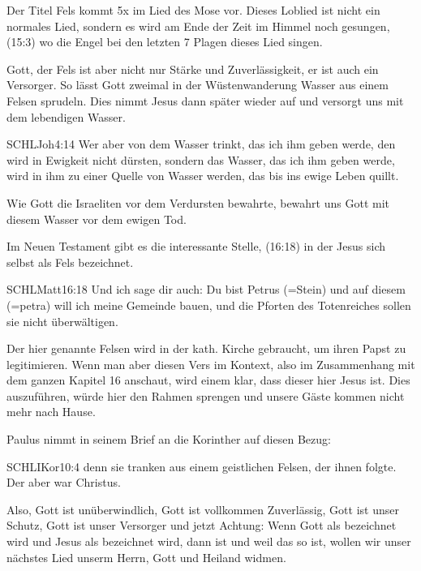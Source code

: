\begin{otsblock}[Gottesnamen]
Der Titel Fels kommt 5x im Lied des Mose vor. Dieses Loblied ist nicht ein normales Lied, sondern es wird am Ende der Zeit im Himmel noch gesungen, (15:3) wo die Engel bei den letzten 7 Plagen dieses Lied singen.

Gott, der Fels ist aber nicht nur Stärke und Zuverlässigkeit, er ist auch ein Versorger. So lässt Gott zweimal in der Wüstenwanderung Wasser aus einem Felsen sprudeln. Dies nimmt Jesus dann später wieder auf und versorgt uns mit dem lebendigen Wasser.
\begin{bibelbox}{SCHL}{Joh}{4:14}
Wer aber von dem Wasser trinkt, das ich ihm geben werde, den wird in Ewigkeit nicht dürsten, sondern das Wasser, das ich ihm geben werde, wird in ihm zu einer Quelle von Wasser werden, das bis ins ewige Leben quillt.
\end{bibelbox}
Wie Gott die Israeliten vor dem Verdursten bewahrte, bewahrt uns Gott mit diesem Wasser vor dem ewigen Tod.

Im Neuen Testament gibt es die interessante Stelle, (16:18) in der Jesus sich selbst als Fels bezeichnet.
\begin{bibelbox}{SCHL}{Matt}{16:18}
Und ich sage dir auch: Du bist Petrus (=Stein) und auf diesem  (=petra) will ich meine Gemeinde bauen, und die Pforten des Totenreiches sollen sie nicht überwältigen.
\end{bibelbox}
Der hier genannte Felsen wird in der kath. Kirche gebraucht, um ihren Papst zu legitimieren. Wenn man aber diesen Vers im Kontext, also im Zusammenhang mit dem ganzen Kapitel 16 anschaut, wird einem klar, dass dieser  hier Jesus ist. Dies auszuführen, würde hier den Rahmen sprengen und unsere Gäste kommen nicht mehr nach Hause.

Paulus nimmt in seinem Brief an die Korinther auf diesen  Bezug:
\begin{bibelbox}{SCHL}{IKor}{10:4}
denn sie tranken aus einem geistlichen Felsen, der ihnen folgte. Der  aber war Christus.
\end{bibelbox}

Also, Gott ist unüberwindlich, Gott ist vollkommen Zuverlässig, Gott ist unser Schutz, Gott ist unser Versorger und jetzt Achtung:
Wenn Gott als  bezeichnet wird und Jesus als  bezeichnet wird, dann ist  und weil das so ist, 
wollen wir unser nächstes Lied unserm Herrn, Gott und Heiland widmen.
\end{otsblock}